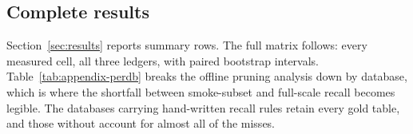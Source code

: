 \documentclass[conference]{IEEEtran}
\begin{document}
\subsection*{Complete results}

\scriptsize
Section~\ref{sec:results} reports summary rows. The full matrix follows: every
measured cell, all three ledgers, with paired bootstrap intervals.
Table~\ref{tab:appendix-perdb} breaks the offline pruning analysis down by
database, which is where the shortfall between smoke-subset and full-scale
recall becomes legible. The databases carrying hand-written recall rules retain
every gold table, and those without account for almost all of the misses.
\normalsize


\end{document}
